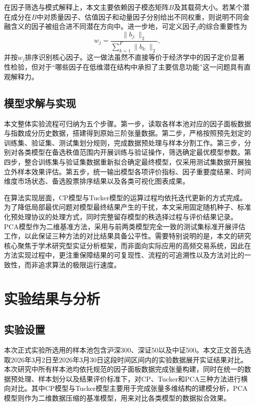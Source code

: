 在因子筛选与模式解释上，本文主要依赖因子模态矩阵$B$及其载荷大小。若某个潜在成分在$B$中对质量因子、估值因子和动量因子分别给出不同权重，则说明不同金融含义的因子被组合进不同潜在方向中。进一步地，可定义因子$j$的综合重要性为
\begin{equation}
w_j=\frac{\|b_{j:}\|_2}{\sum_{k=1}^{F}\|b_{k:}\|_2},
\end{equation}
并按$w_j$排序识别核心因子。这一做法虽然不直接等价于经济学中的因子定价显著性检验，但对于“哪些因子在低维潜在结构中承担了主要信息功能”这一问题具有直观解释力。

\section{模型求解与实现}

本文整体实验流程可归纳为五个步骤。第一步，读取各样本池对应的因子面板数据与指数成分历史数据，搭建得到原始三阶张量数据。第二步，严格按照预先划定的训练集、验证集、测试集划分规则，完成数据预处理与样本分割工作。第三步，分别对各类模型在备选秩值范围内开展训练与验证操作，筛选确定最优模型参数。第四步，整合训练集与验证集数据重新拟合确定最终模型，仅采用测试集数据开展独立外样本效果评估。第五步，统一输出模型各项评价指标、因子重要度结果、时间维度市场状态、备选股票排序结果以及各类可视化图表成果。

在算法实现层面，CP模型与Tucker模型的运算过程均依托迭代更新的方式完成。为了降低局部最优问题对模型最终结果产生的干扰，本文采用固定随机种子、标准化预处理协议的处理方式，同时完整留存模型的秩选择过程与评价结果记录。PCA模型作为二维基准方法，采用与前两类模型完全一致的测试集标准开展评估工作，以此保证三种方法的对比结果具备公平性。需要特别说明的是，本文的研究核心聚焦于学术研究型实证分析框架，而非面向实际应用的高频交易系统，因此在方法实现过程中，更注重保障结果的可复现性、流程的可追溯性以及方法对比的一致性，而非追求算法的极限运行速度。

\chapter{实验结果与分析}

\section{实验设置}

本次正式实验所选用的样本池包含沪深300、深证50以及中证500。本文正文首先选取2026年3月2日至2026年3月30日这段时间区间内的实验数据展开实证结果对比。本次研究中所有样本池均依托规范的因子面板数据完成张量构建，同时在统一的数据预处理、样本划分以及结果评价标准下，对CP、Tucker和PCA三种方法进行横向对比。其中CP模型与Tucker模型主要用于完成张量多维结构的建模分析，PCA模型则作为二维数据压缩的基准模型，用来对比各类模型的数据拟合效果。

